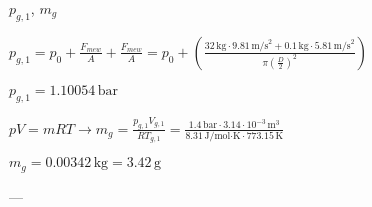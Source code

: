 \( p_{g,1} \), \( m_g \)  

\( p_{g,1} = p_0 + \frac{F_{mew}}{A} + \frac{F_{mew}}{A} = p_0 + \left( \frac{32 \, \text{kg} \cdot 9.81 \, \text{m/s}^2 + 0.1 \, \text{kg} \cdot 5.81 \, \text{m/s}^2}{\pi \left( \frac{D}{2} \right)^2} \right) \)  

\( p_{g,1} = 1.10054 \, \text{bar} \)  

\( pV = mRT \rightarrow m_g = \frac{p_{g,1} V_{g,1}}{R T_{g,1}} = \frac{1.4 \, \text{bar} \cdot 3.14 \cdot 10^{-3} \, \text{m}^3}{8.31 \, \text{J/mol·K} \cdot 773.15 \, \text{K}} \)  

\( m_g = 0.00342 \, \text{kg} = 3.42 \, \text{g} \)  

---